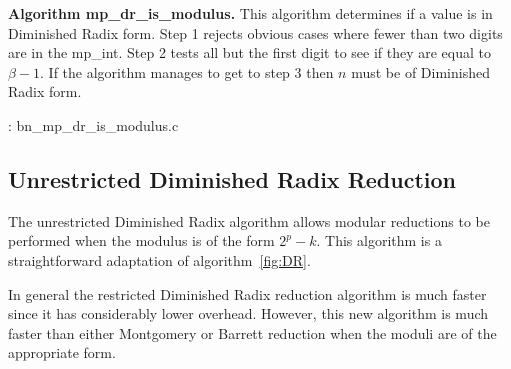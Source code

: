 \documentclass[b5paper]{book}
\begin{document}
\textbf{Algorithm mp\_dr\_is\_modulus.}
This algorithm determines if a value is in Diminished Radix form.  Step 1 rejects obvious cases where fewer than two digits are
in the mp\_int.  Step 2 tests all but the first digit to see if they are equal to $\beta - 1$.  If the algorithm manages to get to
step 3 then $n$ must be of Diminished Radix form.

\vspace{+3mm}\begin{small}
\hspace{-5.1mm}{\bf File}: bn\_mp\_dr\_is\_modulus.c
\vspace{-3mm}
\begin{alltt}
\end{alltt}
\end{small}

\subsection{Unrestricted Diminished Radix Reduction}
The unrestricted Diminished Radix algorithm allows modular reductions to be performed when the modulus is of the form $2^p - k$.  This algorithm
is a straightforward adaptation of algorithm~\ref{fig:DR}.

In general the restricted Diminished Radix reduction algorithm is much faster since it has considerably lower overhead.  However, this new
algorithm is much faster than either Montgomery or Barrett reduction when the moduli are of the appropriate form.
\end{document}
